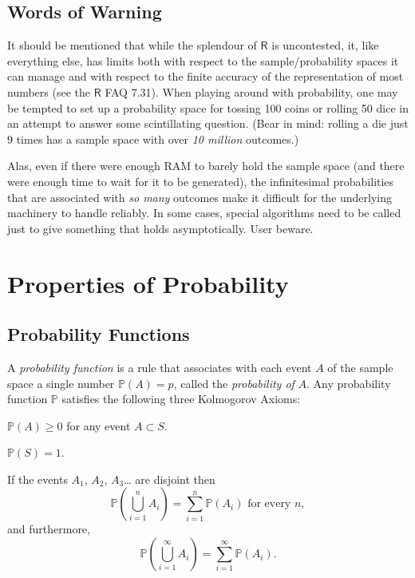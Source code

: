 \documentclass[captions=tableheading]{scrbook}
\begin{document}
\subsection{Words of Warning}
\label{sec-4-3-5}


It should be mentioned that while the splendour of \(\mathsf{R}\) is uncontested,  it, like everything else, has limits both with respect to the sample/probability spaces it can manage and with respect to the finite accuracy of the representation of most numbers (see the \(\mathsf{R}\) FAQ 7.31). When playing around with probability, one may be tempted to set up a probability space for tossing 100 coins or rolling 50 dice in an attempt to answer some scintillating question. (Bear in mind: rolling a die just 9 times has a sample space with over \emph{10 million} outcomes.)

Alas, even if there were enough RAM to barely hold the sample space (and there were enough time to wait for it to be generated), the infinitesimal probabilities that are associated with \emph{so many} outcomes make it difficult for the underlying machinery to handle reliably. In some cases, special algorithms need to be called just to give something
that holds asymptotically. User beware.
\section{Properties of Probability}
\label{sec-4-4}
\label{sec-Properties-of-Probability}
\subsection{Probability Functions}
\label{sec-4-4-1}
\label{sub-Probability-Functions}


A \emph{probability function} is a rule that associates with each event \(A\) of the sample space a single number \(\mathbb{P}(A)=p\), called the \emph{probability of} \(A\). Any probability function \(\mathbb{P}\) satisfies the following three Kolmogorov Axioms: 

\begin{ax}
\(\mathbb{P}(A)\geq0\) for any event \(A\subset S\).
\end{ax}

\begin{ax}
\(\mathbb{P}(S)=1\).
\end{ax}

\begin{ax}
If the events \(A_{1}\), \(A_{2}\), \(A_{3}\)\ldots{} are disjoint then
\begin{equation}
\mathbb{P}\left(\bigcup_{i=1}^{n}A_{i}\right)=\sum_{i=1}^{n}\mathbb{P}(A_{i})\mbox{ for every }n,
\end{equation}
and furthermore,
\begin{equation}
\mathbb{P}\left(\bigcup_{i=1}^{\infty}A_{i}\right)=\sum_{i=1}^{\infty}\mathbb{P}(A_{i}).
\end{equation}
\end{ax}
\end{document}
